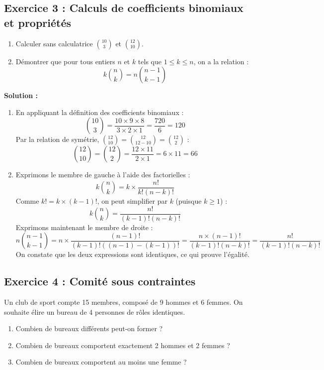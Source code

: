 \subsection*{Exercice 3 : Calculs de coefficients binomiaux et propriétés}
\begin{enumerate}
    \item Calculer sans calculatrice $\binom{10}{3}$ et $\binom{12}{10}$.
    \item Démontrer que pour tous entiers $n$ et $k$ tels que $1 \le k \le n$, on a la relation :
    \[
    k \binom{n}{k} = n \binom{n-1}{k-1}
    \]
\end{enumerate}

\textbf{Solution :}
\begin{enumerate}
    \item En appliquant la définition des coefficients binomiaux :
    \[
    \binom{10}{3} = \frac{10 \times 9 \times 8}{3 \times 2 \times 1} = \frac{720}{6} = 120
    \]
    Par la relation de symétrie, $\binom{12}{10} = \binom{12}{12-10} = \binom{12}{2}$ :
    \[
    \binom{12}{10} = \binom{12}{2} = \frac{12 \times 11}{2 \times 1} = 6 \times 11 = 66
    \]
    
    \item Exprimons le membre de gauche à l'aide des factorielles :
    \[
    k \binom{n}{k} = k \times \frac{n!}{k!(n-k)!}
    \]
    Comme $k! = k \times (k-1)!$, on peut simplifier par $k$ (puisque $k \ge 1$) :
    \[
    k \binom{n}{k} = \frac{n!}{(k-1)!(n-k)!}
    \]
    Exprimons maintenant le membre de droite :
    \[
    n \binom{n-1}{k-1} = n \times \frac{(n-1)!}{(k-1)!((n-1)-(k-1))!} = \frac{n \times (n-1)!}{(k-1)!(n-k)!} = \frac{n!}{(k-1)!(n-k)!}
    \]
    On constate que les deux expressions sont identiques, ce qui prouve l'égalité.
\end{enumerate}

\subsection*{Exercice 4 : Comité sous contraintes}
Un club de sport compte 15 membres, composé de 9 hommes et 6 femmes. On souhaite élire un bureau de 4 personnes de rôles identiques.
\begin{enumerate}
    \item Combien de bureaux différents peut-on former ?
    \item Combien de bureaux comportent exactement 2 hommes et 2 femmes ?
    \item Combien de bureaux comportent au moins une femme ?
\end{enumerate}

